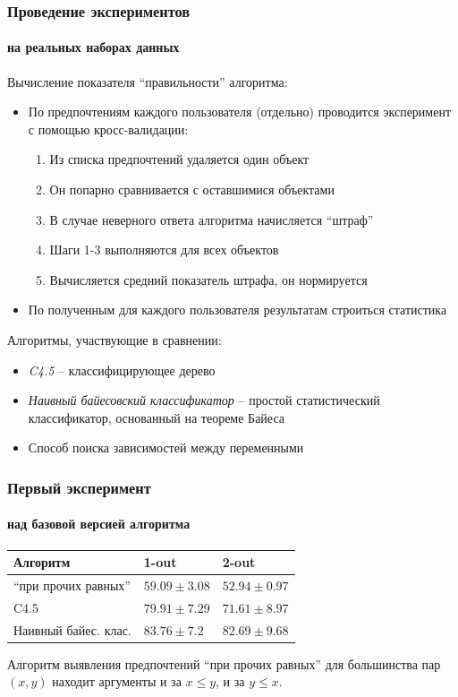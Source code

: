\documentclass[xcolor=table]{beamer}
\theoremstyle{definition}
\begin{document}
	\begin{frame}[allowframebreaks]
		\frametitle{Проведение экспериментов}
		\framesubtitle{на реальных наборах данных}
		
		Вычисление показателя ``правильности'' алгоритма:
		\begin{itemize}
			\item По предпочтениям каждого пользователя (отдельно) проводится эксперимент с помощью кросс-валидации:
			\begin{enumerate}
				\item Из списка предпочтений удаляется один объект
				\item Он попарно сравнивается с оставшимися объектами
				\item В случае неверного ответа алгоритма начисляется ``штраф''
				\item Шаги 1-3 выполняются для всех объектов
				\item Вычисляется средний показатель штрафа, он нормируется 
			\end{enumerate}
			\item По полученным для каждого пользователя результатам строиться статистика
		\end{itemize}
		
		\framebreak
		
		Алгоритмы, участвующие в сравнении:
		\begin{itemize}
			\item \emph{C4.5} – классифицирующее дерево \cite{Quinlan:1993}
			\item \emph{Наивный байесовский классификатор} – простой статистический классификатор, основанный на теореме Байеса \cite{Stigler:1983}
			\item Способ поиска зависимостей между переменными \cite[с.~111-123]{WekaManual}
		\end{itemize}
	\end{frame}
	
	\begin{frame}
		\frametitle{Первый эксперимент}
		\framesubtitle{над базовой версией алгоритма}
		\begin{center}
			\begin{tabular}{|l|ll|}
				\hline
				Алгоритм             & 1-out & 2-out \\ \hline
				\enquote{при прочих равных}      & $59.09 \pm 3.08$ & $52.94 \pm 0.97$ \\
				C4.5                 & $79.91 \pm 7.29$ & $71.61 \pm 8.97$ \\
				Наивный байес. клас. & $83.76 \pm 7.2$ & $82.69 \pm 9.68$ \\ \hline
			\end{tabular}
		\end{center}
		
		\vspace{1.5em}
		Алгоритм выявления предпочтений \enquote{при прочих равных} для большинства пар $(x,y)$ находит аргументы и за $x \leq y$, и за $y \leq x$.
	\end{frame}
	
\end{document}
